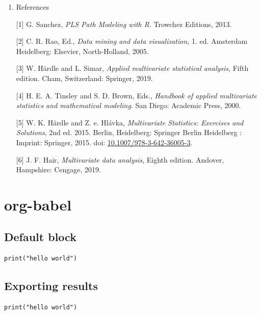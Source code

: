 \documentclass[11pt]{article}
\begin{document}
\begin{enumerate}
\begin{enumerate}
\item References
\label{sec:org16ddd46}

\hypertarget{citeproc_bib_item_1}{[1] G. Sanchez, \textit{PLS Path Modeling with R}. Trowchez Editions, 2013.}

\hypertarget{citeproc_bib_item_2}{[2] C. R. Rao, Ed., \textit{Data mining and data visualization}, 1. ed. Amsterdam Heidelberg: Elsevier, North-Holland, 2005.}

\hypertarget{citeproc_bib_item_3}{[3] W. Härdle and L. Simar, \textit{Applied multivariate statistical analysis}, Fifth edition. Cham, Switzerland: Springer, 2019.}

\hypertarget{citeproc_bib_item_4}{[4] H. E. A. Tinsley and S. D. Brown, Eds., \textit{Handbook of applied multivariate statistics and mathematical modeling}. San Diego: Academic Press, 2000.}

\hypertarget{citeproc_bib_item_5}{[5] W. K. Härdle and Z. e. Hlávka, \textit{Multivariate Statistics: Exercises and Solutions}, 2nd ed. 2015. Berlin, Heidelberg: Springer Berlin Heidelberg : Imprint: Springer, 2015. doi: \href{https://doi.org/10.1007/978-3-642-36005-3}{10.1007/978-3-642-36005-3}.}

\hypertarget{citeproc_bib_item_6}{[6] J. F. Hair, \textit{Multivariate data analysis}, Eighth edition. Andover, Hampshire: Cengage, 2019.}
\end{enumerate}
\end{enumerate}


\section{org-babel}
\label{sec:org77d8fcc}

\subsection{Default block}
\label{sec:org48609dd}

\begin{verbatim}
print("hello world")
\end{verbatim}

\subsection{Exporting results}
\label{sec:org8976c7f}

\begin{verbatim}
print("hello world")
\end{verbatim}
\end{document}

